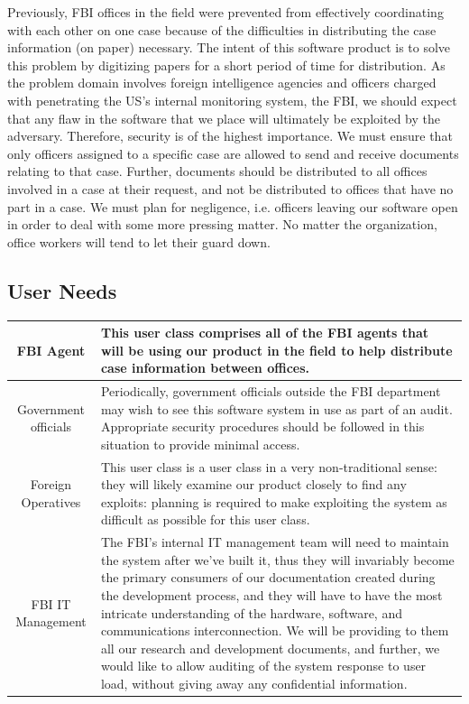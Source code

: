 \documentclass[12pt]{article}
\begin{document}
Previously, FBI offices in the field were prevented from effectively coordinating with each other on one case
because of the difficulties in distributing the case information (on paper) necessary. The intent of this software
product is to solve this problem by digitizing papers for a short period of time for distribution. As the problem
domain involves foreign intelligence agencies and officers charged with penetrating the US’s internal monitoring
system, the FBI, we should expect that any flaw in the software that we place will ultimately be exploited by the
adversary. Therefore, security is of the highest importance. We must ensure that only officers assigned to a
specific case are allowed to send and receive documents relating to that case. Further, documents should be
distributed to all offices involved in a case at their request, and not be distributed to offices that have no
part in a case. We must plan for negligence, i.e. officers leaving our software open in order to deal with some
more pressing matter. No matter the organization, office workers will tend to let their guard down.

\subsection{User Needs}

\begin{center}
    \begin{tabularx}{\linewidth}{|c|X|}
        \hline
        FBI Agent & This user class comprises all of the FBI agents that will be using our product in the field to
        help distribute case information between offices.\\
        \hline
        Government officials & Periodically, government officials outside the FBI department may wish to see this
        software system in use as part of an audit. Appropriate security procedures should be followed in this
        situation to provide minimal access.\\
        \hline
        Foreign Operatives & This user class is a user class in a very non-traditional sense: they will likely
        examine our product closely to find any exploits: planning is required to make exploiting the system as
        difficult as possible for this user class.\\
        \hline
        FBI IT Management & The FBI's internal IT management team will need to maintain the system after we've built
        it, thus they will invariably become the primary consumers of our documentation created during the development
        process, and they will have to have the most intricate understanding of the hardware, software, and communications
        interconnection. We will be providing to them all our research and development documents, and further, we would
        like to allow auditing of the system response to user load, without giving away any confidential information.\\
        \hline
    \end{tabularx}
\end{center}
\end{document}
